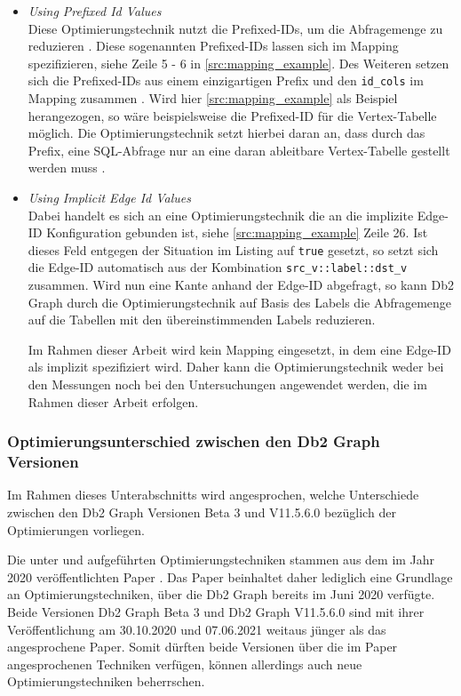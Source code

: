\begin{itemize}
    \item \textit{Using Prefixed Id Values}\\
    Diese Optimierungstechnik nutzt die Prefixed-IDs, um die Abfragemenge zu reduzieren \cite{sigmod_tian}. Diese sogenannten Prefixed-IDs lassen sich im Mapping spezifizieren, siehe Zeile 5 - 6 in \autoref{src:mapping_example}. Des Weiteren setzen sich die Prefixed-IDs aus einem einzigartigen Prefix und den \texttt{id\_cols} im Mapping zusammen \cite{sigmod_tian}. Wird hier \autoref{src:mapping_example} als Beispiel herangezogen, so wäre beispielsweise die Prefixed-ID  für die Vertex-Tabelle möglich. Die Optimierungstechnik setzt hierbei daran an, dass durch das Prefix, eine SQL-Abfrage nur an eine daran ableitbare Vertex-Tabelle gestellt werden muss \cite{sigmod_tian}.

    \item \textit{Using Implicit Edge Id Values}\\
    Dabei handelt es sich an eine Optimierungstechnik die an die implizite Edge-ID Konfiguration gebunden ist, siehe \autoref{src:mapping_example} Zeile 26. Ist dieses Feld entgegen der Situation im Listing auf \texttt{true} gesetzt, so setzt sich die Edge-ID automatisch aus der Kombination \texttt{src\_v::label::dst\_v} zusammen. Wird nun eine Kante anhand der Edge-ID abgefragt, so kann Db2 Graph durch die Optimierungstechnik auf Basis des Labels die Abfragemenge auf die Tabellen mit den übereinstimmenden Labels reduzieren. 

    Im Rahmen dieser Arbeit wird kein Mapping eingesetzt, in dem eine Edge-ID als implizit spezifiziert wird. Daher kann die Optimierungstechnik weder bei den Messungen noch bei den Untersuchungen angewendet werden, die im Rahmen dieser Arbeit erfolgen. 
\end{itemize}

\subsubsection{Optimierungsunterschied zwischen den Db2 Graph Versionen}
\label{subsubsec:optimierung:unterschied_versionen}
Im Rahmen dieses Unterabschnitts wird angesprochen, welche Unterschiede zwischen den Db2 Graph Versionen Beta 3 und V11.5.6.0 bezüglich der Optimierungen vorliegen.

Die unter  und  aufgeführten Optimierungstechniken stammen aus dem im Jahr 2020 veröffentlichten Paper \cite{sigmod_tian}. Das Paper beinhaltet daher lediglich eine Grundlage an Optimierungstechniken, über die Db2 Graph bereits im Juni 2020 verfügte. Beide Versionen Db2 Graph Beta 3 und Db2 Graph V11.5.6.0 sind mit ihrer Veröffentlichung am 30.10.2020 und 07.06.2021 weitaus jünger als das angesprochene Paper. Somit dürften beide Versionen über die im Paper angesprochenen Techniken verfügen, können allerdings auch neue Optimierungstechniken beherrschen. 

